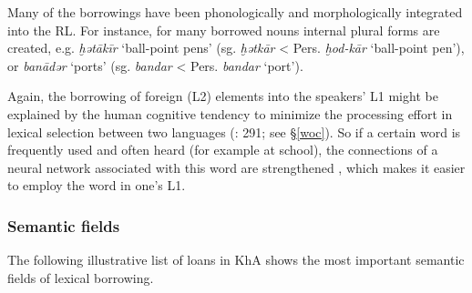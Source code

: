 \documentclass[output=paper,nonflat]{langsci/langscibook}
\begin{document}
Many of the  borrowings have been phonologically and morphologically integrated into the {RL}. For instance, for many borrowed  nouns  {internal plural} forms are created, e.g. \textit{ḫətākīr} ‘ball-point pens’ (sg. \textit{ḫətkār} < Pers. \textit{ḫod-kār} ‘ball-point pen’), or \textit{banādər} ‘ports’ (sg. \textit{bandar} < Pers. \textit{bandar} ‘port’).

Again, the borrowing of foreign (L2) elements into the speakers’ L1 might be explained by the human cognitive tendency to minimize the processing effort in lexical selection between two languages (\citealt{Lucas2012}: 291; see §\ref{woc}). So if a certain  word is frequently used and often heard (for example at school), the connections of a neural network associated with this word are strengthened \citep[291]{Lucas2012}, which makes it easier to employ the word in one’s L1. 


\subsubsection{Semantic fields}

The following illustrative list of  loans in KhA shows the most important semantic fields of lexical borrowing.
\end{document}
